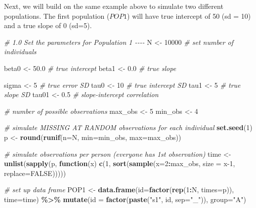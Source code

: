 \documentclass[
]{article}
\newenvironment{Shaded}{\begin{snugshade}}{\end{snugshade}}
\newcommand{\AttributeTok}[1]{\textcolor[rgb]{0.13,0.29,0.53}{#1}}
\newcommand{\CommentTok}[1]{\textcolor[rgb]{0.56,0.35,0.01}{\textit{#1}}}
\newcommand{\ConstantTok}[1]{\textcolor[rgb]{0.56,0.35,0.01}{#1}}
\newcommand{\ControlFlowTok}[1]{\textcolor[rgb]{0.13,0.29,0.53}{\textbf{#1}}}
\newcommand{\DecValTok}[1]{\textcolor[rgb]{0.00,0.00,0.81}{#1}}
\newcommand{\FloatTok}[1]{\textcolor[rgb]{0.00,0.00,0.81}{#1}}
\newcommand{\FunctionTok}[1]{\textcolor[rgb]{0.13,0.29,0.53}{\textbf{#1}}}
\newcommand{\NormalTok}[1]{#1}
\newcommand{\OtherTok}[1]{\textcolor[rgb]{0.56,0.35,0.01}{#1}}
\newcommand{\SpecialCharTok}[1]{\textcolor[rgb]{0.81,0.36,0.00}{\textbf{#1}}}
\newcommand{\StringTok}[1]{\textcolor[rgb]{0.31,0.60,0.02}{#1}}
\begin{document}
Next, we will build on the same example above to simulate two different
populations. The first population (\(POP1\)) will have true intercept of
50 (sd = 10) and a true slope of 0 (sd=5).

\begin{Shaded}
\begin{Highlighting}[]
\CommentTok{\# 1.0 Set the parameters for Population 1 {-}{-}{-}{-}}
\NormalTok{N }\OtherTok{\textless{}{-}} \DecValTok{10000} \CommentTok{\# set number of individuals}

\NormalTok{beta0 }\OtherTok{\textless{}{-}} \FloatTok{50.0} \CommentTok{\# true intercept}
\NormalTok{beta1 }\OtherTok{\textless{}{-}} \FloatTok{0.0} \CommentTok{\# true slope}

\NormalTok{sigma }\OtherTok{\textless{}{-}} \DecValTok{5}  \CommentTok{\# true error SD}
\NormalTok{tau0  }\OtherTok{\textless{}{-}} \DecValTok{10}    \CommentTok{\# true intercept SD}
\NormalTok{tau1  }\OtherTok{\textless{}{-}} \DecValTok{5}  \CommentTok{\# true slope SD}
\NormalTok{tau01 }\OtherTok{\textless{}{-}} \FloatTok{0.5}  \CommentTok{\# slope{-}intercept correlation}

\CommentTok{\# number of possible observations}
\NormalTok{max\_obs }\OtherTok{\textless{}{-}} \DecValTok{5}
\NormalTok{min\_obs }\OtherTok{\textless{}{-}} \DecValTok{4}

\CommentTok{\# simulate MISSING AT RANDOM observations for each individual}
\FunctionTok{set.seed}\NormalTok{(}\DecValTok{1}\NormalTok{)}
\NormalTok{p }\OtherTok{\textless{}{-}} \FunctionTok{round}\NormalTok{(}\FunctionTok{runif}\NormalTok{(}\AttributeTok{n=}\NormalTok{N, }\AttributeTok{min=}\NormalTok{min\_obs, }\AttributeTok{max=}\NormalTok{max\_obs))}

\CommentTok{\# simulate observations per person (everyone has 1st observation)}
\NormalTok{time }\OtherTok{\textless{}{-}} \FunctionTok{unlist}\NormalTok{(}\FunctionTok{sapply}\NormalTok{(p, }\ControlFlowTok{function}\NormalTok{(x) }\FunctionTok{c}\NormalTok{(}\DecValTok{1}\NormalTok{, }\FunctionTok{sort}\NormalTok{(}\FunctionTok{sample}\NormalTok{(}\AttributeTok{x=}\DecValTok{2}\SpecialCharTok{:}\NormalTok{max\_obs, }\AttributeTok{size =}\NormalTok{ x}\DecValTok{{-}1}\NormalTok{, }\AttributeTok{replace=}\ConstantTok{FALSE}\NormalTok{)))))}

\CommentTok{\# set up data frame}
\NormalTok{POP1 }\OtherTok{\textless{}{-}} \FunctionTok{data.frame}\NormalTok{(}\AttributeTok{id=}\FunctionTok{factor}\NormalTok{(}\FunctionTok{rep}\NormalTok{(}\DecValTok{1}\SpecialCharTok{:}\NormalTok{N, }\AttributeTok{times=}\NormalTok{p)), }\AttributeTok{time=}\NormalTok{time) }\SpecialCharTok{\%\textgreater{}\%}
  \FunctionTok{mutate}\NormalTok{(}\AttributeTok{id =} \FunctionTok{factor}\NormalTok{(}\FunctionTok{paste}\NormalTok{(}\StringTok{"s1"}\NormalTok{, id, }\AttributeTok{sep=}\StringTok{"\_"}\NormalTok{)),}
         \AttributeTok{group=}\StringTok{"A"}\NormalTok{)}


\end{Highlighting}
\end{Shaded}
\end{document}
